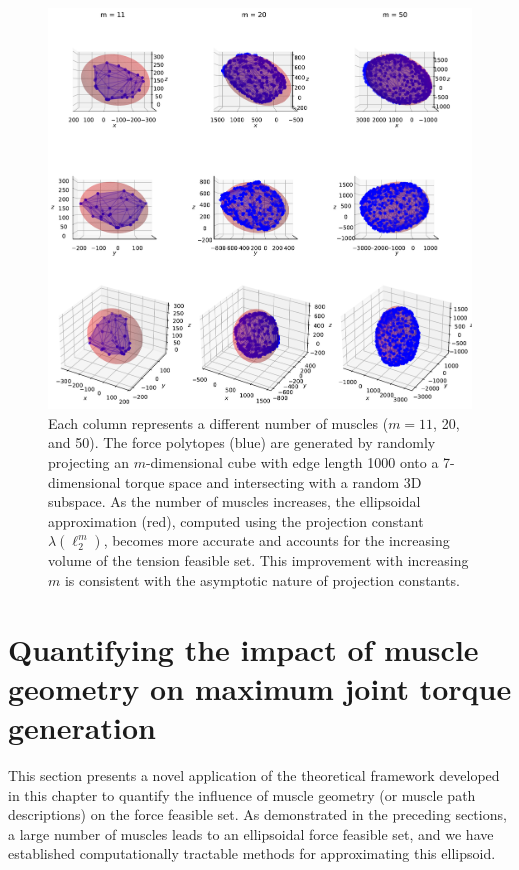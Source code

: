 \begin{figure}[!htb]
\begin{minipage}{1\linewidth}
        \centering
        \includegraphics[trim={0 0 0 500},clip, width=0.9\linewidth]{img/chapter_3/myIma5_projection_constant.pdf}
    \end{minipage}
    
    \caption{Each column represents a different number of muscles ($m = 11$, 20, and 50). The force polytopes (blue) are generated by randomly projecting an $m$-dimensional cube with edge length 1000 onto a 7-dimensional torque space and intersecting with a random 3D subspace. As the number of muscles increases, the ellipsoidal approximation (red), computed using the projection constant $\lambda(\ell_2^m)$, becomes more accurate and accounts for the increasing volume of the tension feasible set. This improvement with increasing $m$ is consistent with the asymptotic nature of projection constants.
    }
    \label{fig:example_proj_constant_applied}
\end{figure}

\section{Quantifying the impact of muscle geometry on maximum joint torque generation}
\label{sec:sensitivity}
This section presents a novel application of the theoretical framework developed in this chapter to quantify the influence of muscle geometry (or muscle path descriptions) on the force feasible set. As demonstrated in the preceding sections, a large number of muscles leads to an ellipsoidal force feasible set, and we have established computationally tractable methods for approximating this ellipsoid.


